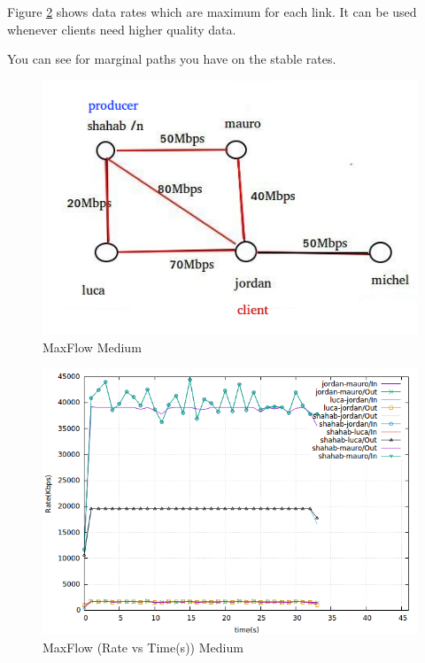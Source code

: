Figure \ref{maxflow} shows data rates which are maximum for each link. It can be used whenever clients need higher quality data.

You can see for marginal paths you have on the stable rates.
\begin{figure}[H]

\begin{center}

\includegraphics[scale = 0.4]{Figures/MaxFlow.png}

\caption{MaxFlow Medium} \label{MaxFlow} 


\end{center}

\end{figure}

\begin{figure}[H]

\begin{center}

\includegraphics[scale = 0.4]{Figures/maxflow.png}

\caption{MaxFlow (Rate vs Time(s)) Medium} \label{maxflow} 


\end{center}

\end{figure}




